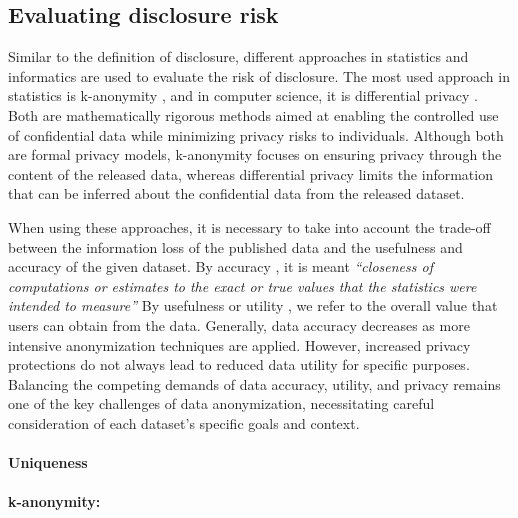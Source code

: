 \documentclass{article}
\begin{document}
\subsection{Evaluating disclosure risk}

Similar to the definition of disclosure, different approaches in statistics and informatics are used to evaluate the risk of disclosure. The most used approach in statistics is k-anonymity \cite{2002_Sweeney}, and in computer science, it is differential privacy \cite{2006_Dwork}. Both are mathematically rigorous methods aimed at enabling the controlled use of confidential data while minimizing privacy risks to individuals. Although both are formal privacy models, k-anonymity focuses on ensuring privacy through the content of the released data, whereas differential privacy limits the information that can be inferred about the confidential data from the released dataset.

When using these approaches, it is necessary to take into account the trade-off between the information loss of the published data and the usefulness and accuracy of the given dataset.
By accuracy \cite{2008_OECD}, it is meant \textit{“closeness of computations or estimates to the exact or true values that the statistics were intended to measure”}
By usefulness or utility \cite{2023_NIST}, we refer to the overall value that users can obtain from the data.
Generally, data accuracy decreases as more intensive anonymization techniques are applied. 
However, increased privacy protections do not always lead to reduced data utility for specific purposes. 
Balancing the competing demands of data accuracy, utility, and privacy remains one of the key challenges of data anonymization, necessitating careful consideration of each dataset's specific goals and context.

\paragraph{Uniqueness}

\paragraph{k-anonymity:}
\end{document}
